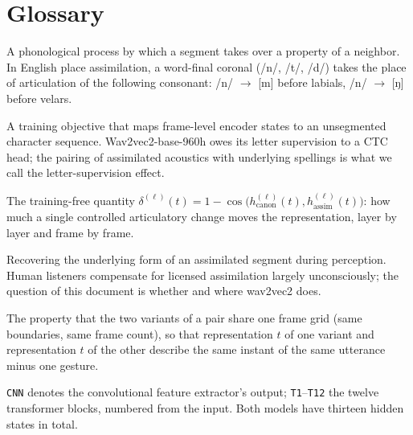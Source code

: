 \documentclass[11pt,a4paper]{article}
\newcommand{\sampa}[1]{\texttt{#1}}
\begin{document}
\needspace{0.25\textheight}
\section{Glossary}\label{sec:glossary}

\begingroup
\small
\begin{description}[leftmargin=1.4em, itemsep=3pt, font=\normalfont\bfseries]

\item[Assimilation (place assimilation)] A phonological process by
which a segment takes over a property of a neighbor. In English place
assimilation, a word-final coronal (/n/, /t/, /d/) takes the place of
articulation of the following consonant: /n/ $\to$ [m] before labials,
/n/ $\to$ [ŋ] before velars.

\item[CTC (connectionist temporal classification)] A training
objective that maps frame-level encoder states to an unsegmented
character sequence. Wav2vec2-base-960h owes its letter supervision to
a CTC head; the pairing of assimilated acoustics with underlying
spellings is what we call the letter-supervision effect.

\item[Causal delta] The training-free quantity
$\delta^{(\ell)}(t)=1-\cos\bigl(h^{(\ell)}_{\text{canon}}(t),
h^{(\ell)}_{\text{assim}}(t)\bigr)$: how much a single controlled
articulatory change moves the representation, layer by layer and
frame by frame.

\item[Compensation] Recovering the underlying form of an assimilated
segment during perception. Human listeners compensate for licensed
assimilation largely unconsciously; the question of this document is
whether and where wav2vec2 does.

\item[Frame alignment] The property that the two variants of a pair
share one frame grid (same boundaries, same frame count), so that
representation $t$ of one variant and representation $t$ of the other
describe the same instant of the same utterance minus one gesture.

\item[Layer names] \sampa{CNN} denotes the convolutional feature
extractor's output; \sampa{T1}--\sampa{T12} the twelve transformer
blocks, numbered from the input. Both models have thirteen hidden
states in total.


\end{description}
\end{document}
